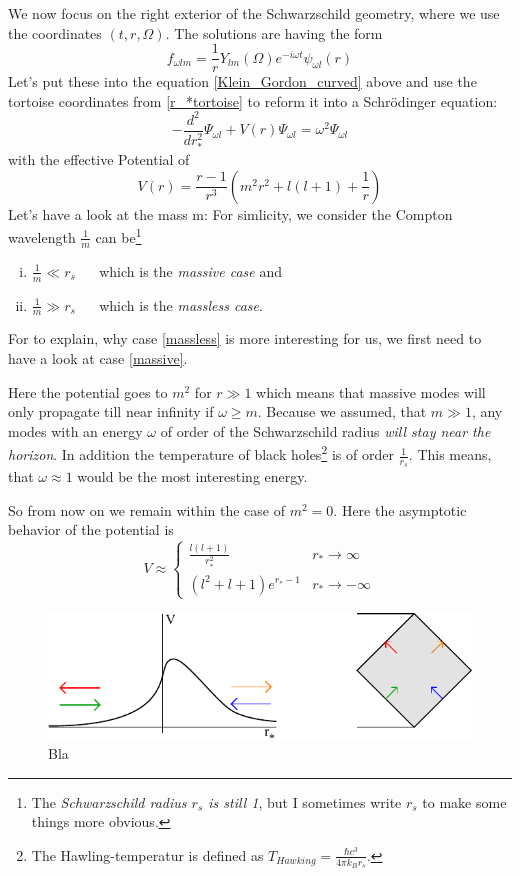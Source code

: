 	We now focus on the right exterior of the Schwarzschild geometry, where we use the coordinates $(t,r, \Omega)$. The solutions are having the form
		\begin{equation}
			f_{\omega l m} = 
			\frac{1}{r} Y_{l m}(\Omega) e^{-i \omega t} \psi_{\omega l}(r)
		\end{equation}
	Let's put these into the equation \eqref{Klein_Gordon_curved} above and use the tortoise coordinates from \eqref{r_*tortoise} to reform it into a Schrödinger equation:
		\begin{equation}
			- \frac{d^2}{dr^2_*} \Psi_{\omega l} 
			+ V(r) \Psi_{\omega l} 
			= \omega^2 \Psi_{\omega l}
		\end{equation}
	with the effective Potential of
		\begin{equation}
			V(r)=
			\frac{r-1}{r^3} \left( m^2r^2 + l(l+1) + \frac{1}{r}
			\right)
		\end{equation}
	Let's have a look at the mass m: For simlicity, we consider the Compton wavelength $\frac{1}{m}$ can be\footnote{ The \textit{Schwarzschild radius $r_s$ is still 1}, but I sometimes write $r_s$ to make some things more obvious.} 
		\begin{enumerate}[(i)]
			\item $\frac{1}{m} \ll r_s$	~~ which is the \textit{massive case} and \label{massive}
			\item $\frac{1}{m} \gg r_s$	~~ which is the \textit{massless case}. \label{massless}
		\end{enumerate}
	For to explain, why case \eqref{massless} is more interesting for us, we first need to have a look at case \eqref{massive}.
	
	 Here the potential goes to $m^2$ for $r \gg 1$ which means that massive modes will only propagate till near infinity if $\omega \geq m$. Because we assumed, that $m \gg 1$, any modes with an energy $\omega$ of order of the Schwarzschild radius \textit{will stay near the horizon}. In addition the temperature of black holes\footnote{The Hawling-temperatur is defined as $T_{Hawking}= 
	 \frac{\hbar c^3}{4 \pi k_B r_s}$.} is of order $\frac{1}{r_s}$. This means, that $\omega \approx 1$ would be the most interesting energy. 
	
	So from now on we remain within the case of $m^2=0$.
	Here the asymptotic behavior of the potential is
		\begin{equation}
			V\approx
			\begin{cases}
				\frac{l(l+1)}{r^2_*} &r_* \rightarrow \infty \\
				(l^2 + l + 1) e^{r_*-1} &r_* \rightarrow - \infty
			\end{cases}
		\end{equation}
		
	\begin{figure} [tbp]
		\begin{center}
			\includegraphics[scale=1.6]{schscat}
			\caption{Bla} \label{plots_of_V}
		\end{center}
	\end{figure}